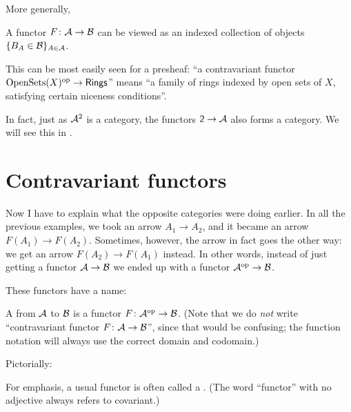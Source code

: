 More generally,
\begin{moral}
	A functor $F \colon \AA \to \BB$ can be viewed
	as an indexed collection of objects $\{ B_A \in \BB \}_{A \in \AA}$.
\end{moral}

This can be most easily seen for a presheaf: ``a contravariant functor $\Opens(X)\op \to
\catname{Rings}$'' means ``a family of rings indexed by open sets of $X$, satisfying certain
niceness conditions''.

In fact, just as $\AA^2$ is a category,
the functors $\catname{2}\to \AA$ also forms a category.
We will see this in .

\section{Contravariant functors}

Now I have to explain what the opposite categories were doing earlier.
In all the previous examples, we took an arrow $A_1 \to A_2$,
and it became an arrow $F(A_1) \to F(A_2)$.
Sometimes, however, the arrow in fact goes the other way:
we get an arrow $F(A_2) \to F(A_1)$ instead.
In other words, instead of just getting a functor $\AA \to \BB$
we ended up with a functor $\AA\op \to \BB$.

These functors have a name:
\begin{definition}
	A  from $\AA$ to $\BB$
	is a functor $F \colon \AA\op \to \BB$.
	(Note that we do \emph{not} write ``contravariant functor $F \colon \AA \to \BB$'',
	since that would be confusing; the function notation will always
	use the correct domain and codomain.)
\end{definition}
Pictorially:
\begin{center}
\end{center}
For emphasis, a usual functor is often called a .
(The word ``functor'' with no adjective always refers to covariant.)

